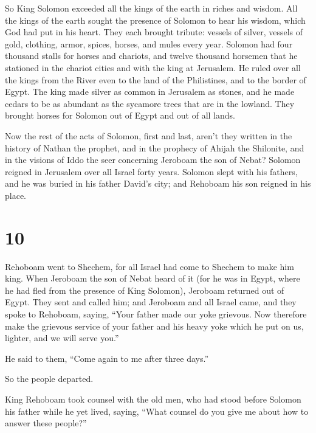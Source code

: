  So King Solomon exceeded all the kings of the earth in
riches and wisdom.  All the kings of the earth sought the
presence of Solomon to hear his wisdom, which God had put in his heart.
 They each brought tribute: vessels of silver, vessels of
gold, clothing, armor, spices, horses, and mules every year.
 Solomon had four thousand stalls for horses and
chariots, and twelve thousand horsemen that he stationed in the chariot
cities and with the king at Jerusalem.  He ruled over all
the kings from the River even to the land of the Philistines, and to the
border of Egypt.  The king made silver as common in
Jerusalem as stones, and he made cedars to be as abundant as the
sycamore trees that are in the lowland.  They brought
horses for Solomon out of Egypt and out of all lands.

 Now the rest of the acts of Solomon, first and last,
aren't they written in the history of Nathan the prophet, and in the
prophecy of Ahijah the Shilonite, and in the visions of Iddo the seer
concerning Jeroboam the son of Nebat?  Solomon reigned in
Jerusalem over all Israel forty years.  Solomon slept
with his fathers, and he was buried in his father David's city; and
Rehoboam his son reigned in his place.

\hypertarget{section-9}{%
\section{10}\label{section-9}}

 Rehoboam went to Shechem, for all Israel had come to
Shechem to make him king.  When Jeroboam the son of Nebat
heard of it (for he was in Egypt, where he had fled from the presence of
King Solomon), Jeroboam returned out of Egypt.  They sent
and called him; and Jeroboam and all Israel came, and they spoke to
Rehoboam, saying,  ``Your father made our yoke grievous.
Now therefore make the grievous service of your father and his heavy
yoke which he put on us, lighter, and we will serve you.''

 He said to them, ``Come again to me after three days.''

So the people departed.

 King Rehoboam took counsel with the old men, who had
stood before Solomon his father while he yet lived, saying, ``What
counsel do you give me about how to answer these people?''

